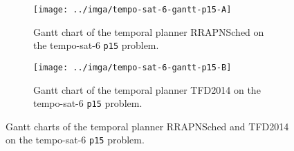 \begin{figure}[tbp]
\centering
\begin{subfigure}{\textwidth}
\centering
\texttt{[image: ../imga/tempo-sat-6-gantt-p15-A]}
\caption{Gantt chart of the temporal planner RRAPNSched on the tempo-sat-6 \texttt{p15} problem.}
\label{fig:tempo-sat-6-gantt-15-a}
\end{subfigure}

\begin{subfigure}{\textwidth}
\centering
\texttt{[image: ../imga/tempo-sat-6-gantt-p15-B]}
\caption{Gantt chart of the temporal planner TFD2014 on the tempo-sat-6 \texttt{p15} problem.}
\label{fig:tempo-sat-6-gantt-15-b}
\end{subfigure}
\caption{Gantt charts of the temporal planner RRAPNSched and TFD2014 on the tempo-sat-6 \texttt{p15} problem.}
\label{fig:tempo-sat-6-gantt}
\end{figure}

